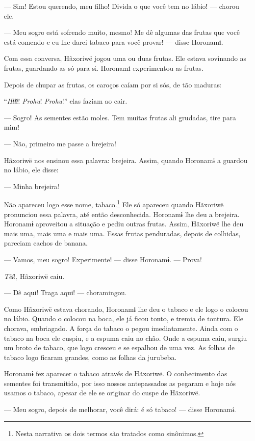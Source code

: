 --- Sim! Estou querendo, meu filho! Divida o que você tem no
lábio! --- chorou ele.

--- Meu sogro está sofrendo muito, mesmo! Me dê algumas das frutas que
você está comendo e eu lhe darei tabaco para você provar! --- disse
Horonamɨ. 

Com essa conversa, Hãxoriwë jogou uma ou duas frutas. Ele estava
sovinando as frutas, guardando-as só para si. Horonamɨ experimentou as
frutas. 

Depois de chupar as frutas, os caroços caíam por si sós, de tão maduras:

``\textit{Hɨ̃ɨɨ}! \textit{Prohu}! \textit{Prohu}!'' elas faziam ao cair. 

--- Sogro! As sementes estão moles. Tem muitas frutas ali grudadas, tire
para mim! 

--- Não, primeiro me passe a brejeira! 

Hãxoriwë nos ensinou essa palavra: brejeira. Assim, quando Horonamɨ a
guardou no lábio, ele disse: 

--- Minha brejeira! 

Não apareceu logo esse nome, tabaco.\footnote{Nesta narrativa os dois termos 
são tratados como sinônimos.}  Ele só apareceu
quando Hãxoriwë pronunciou essa palavra, até então desconhecida.
Horonamɨ lhe deu a brejeira. Horonamɨ aproveitou a situação e pediu
outras frutas. Assim, Hãxoriwë lhe deu mais uma, mais uma e mais uma.
Essas frutas penduradas, depois de colhidas, pareciam cachos de banana. 

--- Vamos, meu sogro! Experimente! --- disse Horonamɨ. --- Prova!

\textit{Tëɨ}!, Hãxoriwë caiu. 

--- Dê aqui! Traga aqui! --- choramingou. 

Como Hãxoriwë estava chorando, Horonamɨ lhe deu o tabaco e ele
logo o colocou no lábio. Quando o colocou na boca, ele já ficou tonto, e
tremia de tontura. Ele chorava, embriagado. A força do tabaco o pegou
imediatamente. Ainda com o tabaco na boca ele cuspiu, e a espuma caiu no
chão. Onde a espuma caiu, surgiu um broto de tabaco, que logo cresceu e
se espalhou de uma vez. As folhas de tabaco logo ficaram grandes, como as folhas da jurubeba. 

Horonamɨ fez aparecer o tabaco através de Hãxoriwë. O conhecimento das sementes foi transmitido, por isso nossos antepassados as pegaram e hoje nós usamos o tabaco, apesar de ele se originar do cuspe de Hãxoriwë. 

--- Meu sogro, depois de melhorar, você dirá: é só tabaco! --- disse
Horonamɨ. 

